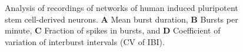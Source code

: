 \documentclass[12pt, titlepage]{article}
\begin{document}
		\begin{figure}[h]
			\centering
			\caption{Analysis of recordings of networks of human induced pluripotent stem cell-derived neurons. \textbf{A} Mean burst duration, \textbf{B} Bursts per minute, \textbf{C} Fraction of spikes in bursts, and \textbf{D} Coefficient of variation of interburst intervals (CV of IBI).}
			\label{hiPSN_results}
		\end{figure}
\end{document}
